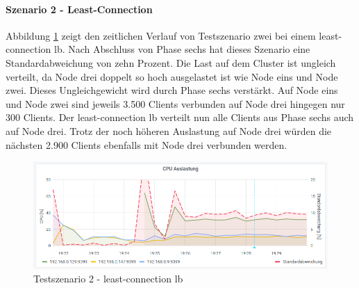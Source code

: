 \paragraph{Szenario 2 - Least-Connection}
Abbildung \ref{fig:s2-lc} zeigt den zeitlichen Verlauf von Testszenario zwei bei einem least-connection \ac{lb}.
Nach Abschluss von Phase sechs hat dieses Szenario eine Standardabweichung von zehn Prozent.
Die Last auf dem Cluster ist ungleich verteilt, da Node drei doppelt so hoch ausgelastet ist wie Node eins und Node zwei.
Dieses Ungleichgewicht wird durch Phase sechs verstärkt. Auf Node eins und Node zwei sind jeweils 3.500 Clients verbunden auf Node drei hingegen nur 300 Clients. Der least-connection \acl{lb} verteilt nun alle Clients aus Phase sechs auch auf Node drei. Trotz der noch höheren Auslastung auf Node drei würden die nächsten 2.900 Clients ebenfalls mit Node drei verbunden werden.
\newpage
\begin{figure}[h]
    \centering
    \includegraphics[scale=0.8]{images/s2_lc.png}
    \caption{Testszenario 2 - least-connection \acl{lb}}
    \label{fig:s2-lc}
\end{figure}

